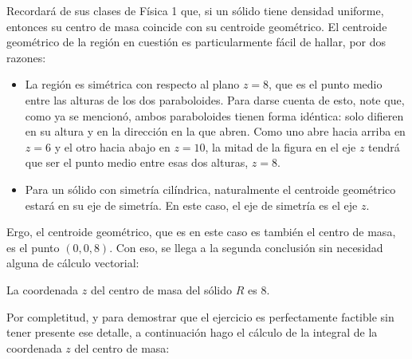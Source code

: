 \documentclass{fmbvecto}
\begin{document}
\begin{problema}
\vspace*{1em}
Recordará de sus clases de Física 1 que, si un sólido tiene densidad uniforme, entonces su centro de masa coincide con su centroide geométrico. El centroide geométrico de la región en cuestión es particularmente fácil de hallar, por dos razones:
\begin{itemize}
    \item La región es simétrica con respecto al plano \(z = 8\), que es el punto medio entre las alturas de los dos paraboloides. Para darse cuenta de esto, note que, como ya se mencionó, ambos paraboloides tienen forma idéntica: solo difieren en su altura y en la dirección en la que abren. Como uno abre hacia arriba en \(z = 6\) y el otro hacia abajo en \(z = 10\), la mitad de la figura en el eje \(z\) tendrá que ser el punto medio entre esas dos alturas, \(z = 8\).
    \item Para un sólido con simetría cilíndrica, naturalmente el centroide geométrico estará en su eje de simetría. En este caso, el eje de simetría es el eje \(z\).
\end{itemize}
Ergo, el centroide geométrico, que es en este caso es también el centro de masa, es el punto \((0, 0, 8)\). Con eso, se llega a la segunda conclusión sin necesidad alguna de cálculo vectorial:
\begin{gbox}
    La coordenada \(z\) del centro de masa del sólido \(R\) es \(8\).
\end{gbox}

Por completitud, y para demostrar que el ejercicio es perfectamente factible sin tener presente ese detalle, a continuación hago el cálculo de la integral de la coordenada \(z\) del centro de masa:


\end{problema}
\end{document}
